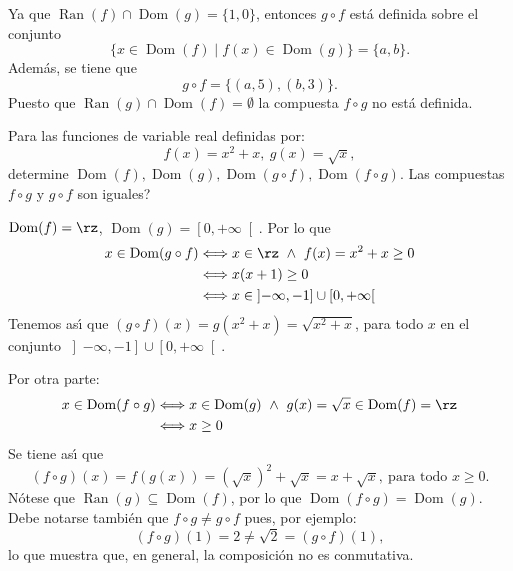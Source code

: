 \begin{sol}
Ya que $\operatorname*{Ran}(f)\cap\operatorname*{Dom}(g)=\{1,0\}$, entonces
$g\circ f$ est\'{a} definida sobre el conjunto
\[
\{x\in\operatorname*{Dom}(f)\mid f(x)\in\operatorname*{Dom}(g)\}=\{a,b\}.
\]
Adem\'{a}s, se tiene que
\[
g\circ f=\{(a,5),(b,3)\}.
\]
Puesto que $\operatorname*{Ran}(g)\cap\operatorname*{Dom}(f)=\emptyset$ la
compuesta $f\circ g$ no est\'{a} definida.
\end{sol}

\begin{example}
Para las funciones de variable real definidas por:
\[
f(x)=x^{2}+x,\ g(x)=\sqrt{x},
\]
determine $\operatorname*{Dom}\left(  f\right)  ,\operatorname*{Dom}\left(
g\right)  ,\operatorname*{Dom}\left(  g\circ f\right)  ,\operatorname*{Dom}%
\left(  f\circ g\right)  .$ \textquestiondown Las compuestas $f\circ g$ y
$g\circ f$ son iguales?
\end{example}

\begin{sol}
$\operatorname*{Dom}(f)=\rz$, $\operatorname*{Dom}(g)=\left[  0,+\infty
\right[  $. Por lo que
\begin{align*}
x\in\operatorname*{Dom}(g\circ f)  &  \Longleftrightarrow x\in\rz\ \wedge
\ f(x)=x^{2}+x\geq0\\
&  \Longleftrightarrow x(x+1)\geq0\\
&  \Longleftrightarrow x\in\left]  -\infty,-1\right]  \cup\left[
0,+\infty\right[
\end{align*}
Tenemos as\'{\i} que $(g\circ f)(x)=g(x^{2}+x)=\sqrt{x^{2}+x}$, para todo $x$
en el conjunto $\left]  -\infty,-1\right]  \cup\left[  0,+\infty\right[  $.

Por otra parte:
\begin{align*}
x\in\operatorname*{Dom}(f\circ g)  &  \Longleftrightarrow x\in
\operatorname*{Dom}(g)\ \wedge\ g(x)=\sqrt{x}\in\operatorname*{Dom}(f)=\rz\\
&  \Longleftrightarrow x\geq0
\end{align*}
Se tiene as\'{\i} que
\[
(f\circ g)(x)=f(g(x))=(\sqrt{x})^{2}+\sqrt{x}=x+\sqrt{x},\ \mbox{para
todo \ }x\geq0.
\]
N\'{o}tese que $\operatorname*{Ran}(g)\subseteq\operatorname*{Dom}(f)$, por lo
que $\operatorname*{Dom}(f\circ g)=\operatorname*{Dom}(g)$. Debe notarse
tambi\'{e}n que $f\circ g\neq g\circ f$ pues, por ejemplo:
\[
(f\circ g)(1)=2\neq\sqrt{2}=(g\circ f)(1),
\]
lo que muestra que, en general, la composici\'{o}n no es conmutativa.
\end{sol}

